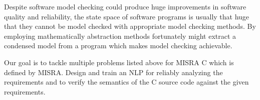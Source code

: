 \begin{multicols}{2}
	Despite software model checking could produce huge improvements in software quality and reliability, the state space of software programs is usually that huge that they cannot be model checked with appropriate model checking methods. By employing mathematically abstraction methods fortunately might extract a condensed model from a program which makes model checking achievable.
	
	Our goal is to tackle multiple problems listed above for MISRA C which is defined by \gls{MISRA}. Design and train an \gls{NLP} for reliably analyzing the requirements and to verify the semantics of the C source code against the given requirements.
	
\end{multicols}

